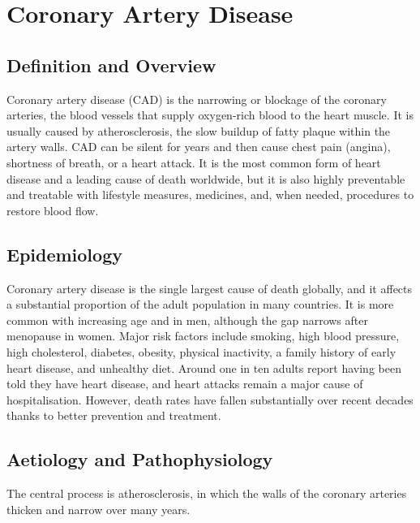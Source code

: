 \chapter{Coronary Artery Disease}

\section*{Definition and Overview}
Coronary artery disease (CAD) is the narrowing or blockage of the coronary arteries, the blood vessels that supply oxygen-rich blood to the heart muscle. It is usually caused by atherosclerosis, the slow buildup of fatty plaque within the artery walls. CAD can be silent for years and then cause chest pain (angina), shortness of breath, or a heart attack. It is the most common form of heart disease and a leading cause of death worldwide, but it is also highly preventable and treatable with lifestyle measures, medicines, and, when needed, procedures to restore blood flow.

\section*{Epidemiology}
Coronary artery disease is the single largest cause of death globally, and it affects a substantial proportion of the adult population in many countries. It is more common with increasing age and in men, although the gap narrows after menopause in women. Major risk factors include smoking, high blood pressure, high cholesterol, diabetes, obesity, physical inactivity, a family history of early heart disease, and unhealthy diet. Around one in ten adults report having been told they have heart disease, and heart attacks remain a major cause of hospitalisation. However, death rates have fallen substantially over recent decades thanks to better prevention and treatment.

\section*{Aetiology and Pathophysiology}
The central process is atherosclerosis, in which the walls of the coronary arteries thicken and narrow over many years.

